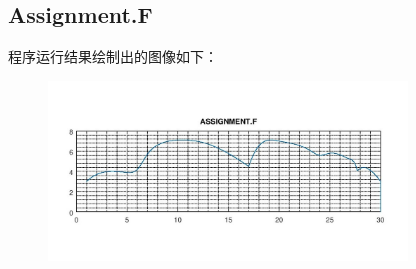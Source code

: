 \documentclass[a4paper,11.5pt,UTF8]{ctexart}
\begin{document}
\begin{large}
\subsection{Assignment.F}
\par 程序运行结果绘制出的图像如下：
\begin{figure}[H]
	\centering
	\includegraphics[width=0.85\textwidth]{../plot/figure/figure_F.jpg}
\end{figure}


\end{large}
\end{document}
